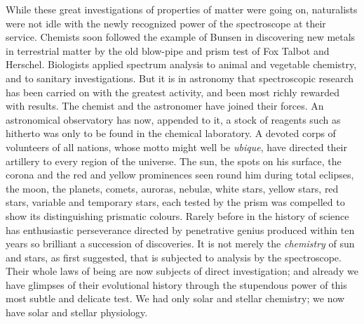 \documentclass[a4paper, 11pt, oneside, english]{article}
\begin{document}
While these great investigations of properties of matter were going on, naturalists were not idle with the newly recognized power of the spectroscope at their service. Chemists soon followed the example of Bunsen in discovering new metals in terrestrial matter by the old blow-pipe and prism test of Fox Talbot and Herschel. Biologists applied spectrum analysis to animal and vegetable chemistry, and to sanitary investigations. But it is in astronomy that spectroscopic research has been carried on with the greatest activity, and been most richly rewarded with results. The chemist and the astronomer have joined their forces. An astronomical observatory has now, appended to it, a stock of reagents such as hitherto was only to be found in the chemical laboratory. A devoted corps of volunteers of all nations, whose motto might well be \emph{ubique}, have directed their artillery to every region of the universe. The sun, the spots on his surface, the corona and the red and yellow prominences seen round him during total eclipses, the moon, the planets, comets, auroras, nebulæ, white stars, yellow stars, red stars, variable and temporary stars, each tested by the prism was compelled to show its distinguishing prismatic colours. Rarely before in the history of science has enthusiastic perseverance directed by penetrative genius produced within ten years so brilliant a succession of discoveries. It is not merely the \emph{chemistry} of sun and stars, as first suggested, that is subjected to analysis by the spectroscope. Their whole laws of being are now subjects of direct investigation; and already we have glimpses of their evolutional history through the stupendous power of this most subtle and delicate test. We had only solar and stellar chemistry; we now have solar and stellar physiology.
\end{document}
